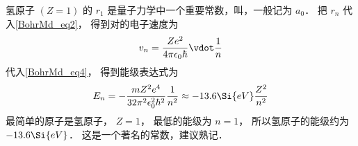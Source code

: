 氢原子 $(Z=1)$ 的 $r_1$ 是量子力学中一个重要常数，叫，一般记为 $a_0$． 把 $r_n$ 代入\autoref{BohrMd_eq2}， 得到对的电子速度为
\begin{equation}\label{BohrMd_eq10}
v_n = \frac{Z e^2}{4\pi\epsilon_0\hbar} \vdot \frac{1}{n}
\end{equation}
代入\autoref{BohrMd_eq4}， 得到能级表达式为
\begin{equation}\label{BohrMd_eq11}
E_n =  - \frac{mZ^2 e^4}{32\pi^2\epsilon_0^2 \hbar ^2} \frac{1}{n^2} \approx  - 13.6\Si{eV}\frac{Z^2}{n^2}
\end{equation}
最简单的原子是氢原子， $Z = 1$， 最低的能级为 $n = 1$， 所以氢原子的能级约为 $-13.6\Si{eV}$． 这是一个著名的常数，建议熟记．









